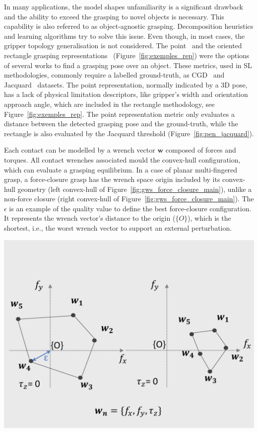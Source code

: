 In many applications, the model shapes unfamiliarity is a significant drawback and the ability to exceed the grasping to novel objects is necessary. This capability is also referred to as object-agnostic grasping. Decomposition heuristics and learning algorithms try to solve this issue. Even though, in most cases, the gripper topology generalisation is not considered. The point~\cite{Saxena2008} and the oriented rectangle grasping representations~\cite{Jiang2011a} (Figure~\ref{fig:exemples_rep}) were the options of several works to find a grasping pose over an object. These metrics, used in \ac{SL} methodologies, commonly require a labelled ground-truth, as \ac{CGD}~\cite{conerll_database} and Jacquard~\cite{jacquard_dataset} datasets. The point representation, normally indicated by a 3D pose, has a lack of physical limitation descriptors, like gripper's width and orientation approach angle, which are included in the rectangle methodology, see Figure~\ref{fig:exemples_rep}. The point representation metric only evaluates a distance between the detected grasping pose and the ground-truth, while the rectangle is also evaluated by the Jacquard threshold (Figure~\ref{fig:pen_jacquard}).


\begin{tcolorbox}[every float=\centering, drop shadow, title= Wrench Space Analyses]
Each contact can be modelled by a wrench vector $\mathbf{w}$ composed of forces and torques. All contact wrenches associated mould the convex-hull configuration, which can evaluate a grasping equilibrium. In a case of planar multi-fingered grasp, a force-closure grasp has the wrench space origin included by its convex-hull geometry (left convex-hull of Figure~\ref{fig:gws_force_closure_main}), unlike a non-force closure (right convex-hull of Figure~\ref{fig:gws_force_closure_main}). The $\epsilon$ is an example of the quality value to define the best force-closure configuration. It represents the wrench vector's distance to the origin ($\{O\}$), which is the shortest, i.e., the worst wrench vector to support an external perturbation.

\vspace*{1ex}

\centerline{\includegraphics[trim={0cm 1.2cm 0cm 5.5cm},clip,width=0.65\linewidth,angle=0]{Cap2/Figuras/wrenchspace_anlayses_2.pdf}}
\label{fig:gws_force_closure_main}
\end{tcolorbox}

